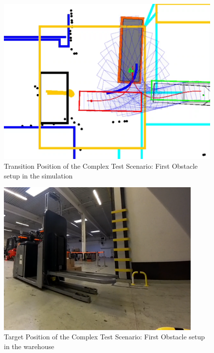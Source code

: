 \begin{figure}[H]
    \begin{center}
        \includegraphics[width=4.5in]{images/Chap3/Test2_ObsLeftVehic/Transition_simu.png} %
        \caption{Transition Position of the Complex Test Scenario: First Obstacle setup in the simulation}
        \label{OptResult15}
        \end{center}    
\end{figure}

\begin{figure}[H]
    \begin{center}
        \includegraphics[width=4in]{images/Chap3/Test2_ObsLeftVehic/Target_real.png} %
        \caption{Target Position of the Complex Test Scenario: First Obstacle setup in the warehouse}
        \label{OptResult16}
        \end{center}    
\end{figure}

